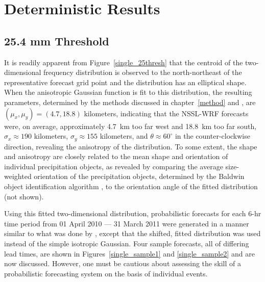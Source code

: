 

\section{Deterministic Results}
\label{dresults}


\subsection{25.4 mm Threshold}
\label{dresults_25.4mm}

It is readily apparent from \mbox{Figure \ref{single_25thresh}} that the centroid of the two-dimensional frequency distribution is observed to the north-northeast of the representative forecast grid point and the distribution has an elliptical shape.
When the anisotropic Gaussian function is fit to this distribution, the resulting parameters, determined by the methods discussed in \mbox{chapter \ref{method}} and \cite{Lak2010}, are $(\mu_x, \mu_y) = (4.7, 18.8)$ kilometers, indicating that the NSSL-WRF forecasts were, on average, approximately \mbox{4.7 km} too far west and \mbox{18.8 km} too far south, $\sigma_x \approx 190$ kilometers, $\sigma_y \approx 155$ kilometers, and $\theta \approx 60^{\circ}$ in the counter-clockwise direction, revealing the anisotropy of the distribution.
To some extent, the shape and anisotropy are closely related to the mean shape and orientation of individual precipitation objects, as revealed by comparing the average size-weighted orientation of the precipitation objects, determined by the Baldwin object identification algorithm \citep{Baldwin2005}, to the orientation angle of the fitted distribution (not shown).


Using this fitted two-dimensional distribution, probabilistic forecasts for each \mbox{6-hr} time period from 01 April 2010 --- 31 March 2011 were generated in a manner similar to what was done by \cite{Sobash2011}, except that the shifted, fitted distribution was used instead of the simple isotropic Gaussian.
Four sample forecasts, all of differing lead times, are shown in \mbox{Figures \ref{single_sample1}} and \ref{single_sample2} and are now discussed.
However, one must be cautious about assessing the skill of a probabilistic forecasting system on the basis of individual events.


